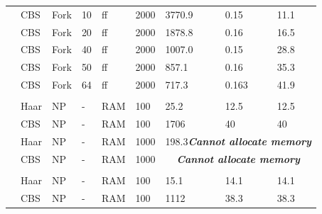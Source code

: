 \documentclass[a4paper,11pt]{article}
\newcounter{magicrownumbers}
\newcommand\rownumber{\stepcounter{magicrownumbers}\arabic{magicrownumbers}}
\begin{document}
\begin{center}
\begin{threeparttable}
\begin{tabular}{lp{1.3cm}p{1.2cm}p{1.0cm}p{0.85cm}p{1.2cm}p{1.9cm}p{1.55cm}p{1.8cm}}
\rownumber&CBS & Fork &10  & ff & 2000 &3770.9 & 0.15 & 11.1 \\
\rownumber&CBS & Fork &20 & ff & 2000 & 1878.8 & 0.16 & 16.5 \\
\rownumber&CBS & Fork &40  & ff & 2000 & 1007.0 & 0.15 & 28.8 \\
\rownumber&CBS & Fork &50  & ff & 2000 & 857.1 & 0.16 & 35.3 \\
\rownumber&CBS & Fork & 64  & ff & 2000 & 717.3 & 0.163 & 41.9 \\

&&&&&&&\\


\rownumber&Haar & NP &-  &RAM  & 100 &  25.2\tnote{a}   & 12.5 & 12.5  \\
\rownumber&CBS     & NP &-  &RAM  & 100 & 1706\tnote{b}  &   40   &  40\\
\rownumber&Haar & NP &-  &RAM  & 1000 &
\multicolumn{3}{c}{198.3\tnote{c}\quad \textit{\textbf{Cannot allocate memory}}} \\
\rownumber&CBS     & NP &-  &RAM  & 1000 &
\multicolumn{3}{c}{\textit{\qquad\textbf{Cannot allocate memory}}}\\

&&&&&&&\\
\rownumber&Haar & NP &-  &RAM  & 100 &  15.1\tnote{d}   & 14.1 & 14.1  \\
\rownumber&CBS     & NP &-  &RAM  & 100 & 1112\tnote{e}  &   38.3   &  38.3\\


\hline
   
  \end{tabular}

  \begin{tablenotes}
    {\footnotesize

}
\end{tablenotes}
\end{threeparttable}
\end{center}
\end{document}
